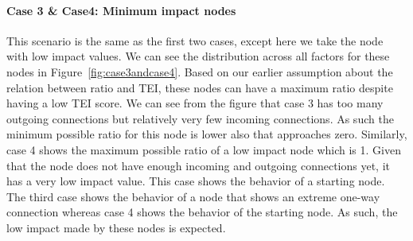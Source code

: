 \paragraph{Case 3 \& Case4: Minimum impact nodes}This scenario is the same as
the first two cases, except here we take the node with low impact values. We
can see the distribution across all factors for these nodes in
Figure~\ref{fig:case3andcase4}. Based on our earlier assumption about the
relation between ratio and \ac{TEI}, these nodes can have a maximum ratio
despite having a low \ac{TEI} score. We can see from the figure that case 3 has
too many outgoing connections but relatively very few incoming connections. As
such the minimum possible ratio for this node is lower also that approaches
zero. Similarly, case 4 shows the maximum possible ratio of a low impact node
which is 1. Given that the node does not have enough incoming and outgoing
connections yet, it has a very low impact value. This case shows the behavior
of a starting node. The third case shows the behavior of a node that shows an
extreme one-way connection whereas case 4 shows the behavior of the starting
node. As such, the low impact made by these nodes is expected. 

%





